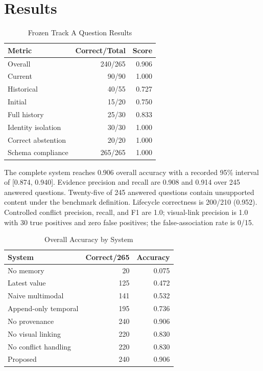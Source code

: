 \documentclass[conference]{IEEEtran}
\begin{document}
\section{Results}
\begin{table}[t]
\caption{Frozen Track A Question Results}
\label{tab:qa}
\centering
\footnotesize
\begin{tabular}{lrr}
\toprule
Metric & Correct/Total & Score \\
\midrule
Overall & 240/265 & 0.906 \\
Current & 90/90 & 1.000 \\
Historical & 40/55 & 0.727 \\
Initial & 15/20 & 0.750 \\
Full history & 25/30 & 0.833 \\
Identity isolation & 30/30 & 1.000 \\
Correct abstention & 20/20 & 1.000 \\
Schema compliance & 265/265 & 1.000 \\
\bottomrule
\end{tabular}
\end{table}

The complete system reaches 0.906 overall accuracy with a recorded 95\% interval of [0.874, 0.940]. Evidence precision and recall are 0.908 and 0.914 over 245 answered questions. Twenty-five of 245 answered questions contain unsupported content under the benchmark definition. Lifecycle correctness is 200/210 (0.952). Controlled conflict precision, recall, and F1 are 1.0; visual-link precision is 1.0 with 30 true positives and zero false positives; the false-association rate is 0/15.

\begin{table}[t]
\caption{Overall Accuracy by System}
\label{tab:systems}
\centering
\footnotesize
\begin{tabular}{lrr}
\toprule
System & Correct/265 & Accuracy \\
\midrule
No memory & 20 & 0.075 \\
Latest value & 125 & 0.472 \\
Naive multimodal & 141 & 0.532 \\
Append-only temporal & 195 & 0.736 \\
No provenance & 240 & 0.906 \\
No visual linking & 220 & 0.830 \\
No conflict handling & 220 & 0.830 \\
Proposed & 240 & 0.906 \\
\bottomrule
\end{tabular}
\end{table}
\end{document}
